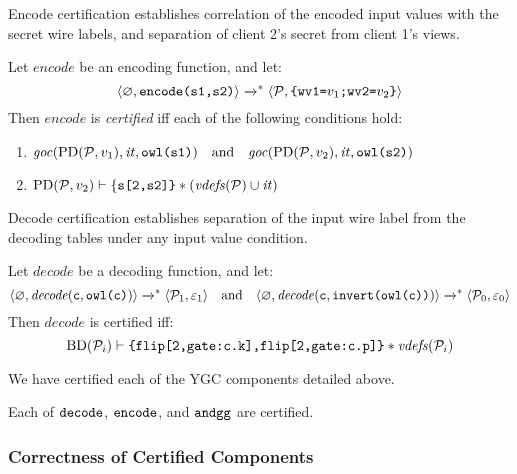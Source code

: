 Encode certification establishes correlation of the encoded input values with
the secret wire labels, and separation of client 2's secret from client 1's views. 
\begin{definition}
  Let $\mathit{encode}$ be an encoding function, and let:
  $$
  \langle \varnothing,\texttt{encode(s1,s2)} \rangle \xrightarrow{}^{*}
  \langle \mathcal{P},\texttt{\{wv1=}v_1\texttt{;wv2=}v_2\texttt{\}} \rangle
  $$
  Then $\mathit{encode}$ is \emph{certified} iff each of the following conditions hold:
  \begin{enumerate}[\hspace{5mm}i.]
  \item $\mathit{goc}(\mathrm{PD}(\mathcal{P},v_1),\mathit{it},\texttt{owl(s1)}) \quad \text{and} \quad
    \mathit{goc}(\mathrm{PD}(\mathcal{P},v_2),\mathit{it},\texttt{owl(s2)})$
  \item $\mathrm{PD}(\mathcal{P},v_2) \vdash \{\texttt{s[2,s2]\}} * (\mathit{vdefs}(\mathcal{P}) \cup \mathit{it})$
  \end{enumerate}
\end{definition}
Decode certification establishes separation of the input wire
label from the decoding tables under any input value condition. 
\begin{definition}
  Let $\mathit{decode}$ be a decoding function, and let:
  $$
  \langle \varnothing,\mathit{decode}(\texttt{c}, \texttt{owl(c)}) \rangle
  \xrightarrow{}^{*} \langle \mathcal{P}_1,\varepsilon_1 \rangle
  \quad \text{and} \quad
  \langle \varnothing,\mathit{decode}(\texttt{c}, \texttt{invert(owl(c))}) \rangle
  \xrightarrow{}^{*} \langle \mathcal{P}_0,\varepsilon_0 \rangle
  $$
  Then $\mathit{decode}$ is certified iff:
  $$
  \mathrm{BD}(\mathcal{P}_i) \vdash \texttt{\{flip[2,gate:c.k],flip[2,gate:c.p]\}} * \mathit{vdefs}(\mathcal{P}_i)
  $$
\end{definition}
We have certified each of the YGC components detailed above. 
\begin{lemma}
  \label{lemma-certification}
  Each of $\texttt{decode}$, $\texttt{encode}$, and $\texttt{andgg}$ are certified.
\end{lemma}

\subsubsection{Correctness of Certified Components}
\label{section-composition-metatheory}

